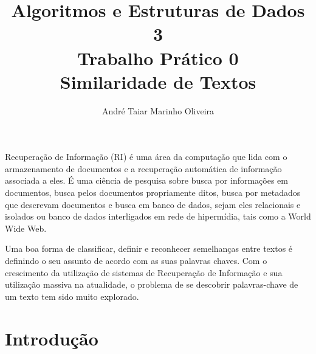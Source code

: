\documentclass[12pt]{article}
\title{Algoritmos e Estruturas de Dados 3 \\ Trabalho Prático 0 \\
\huge{Similaridade de Textos}}
\author{André Taiar Marinho Oliveira}
\begin{document}
\maketitle

\begin{resumo}
Recuperação de Informação (RI) é uma área da computação  que lida com o armazenamento de documentos 
e a recuperação automática de informação associada a eles. É uma ciência de pesquisa sobre busca 
por informações em documentos, busca pelos documentos propriamente ditos, busca por metadados que 
descrevam documentos e busca em banco de dados, sejam eles relacionais e isolados ou banco de 
dados interligados em rede de hipermídia, tais como a World Wide Web.

Uma boa forma de classificar, definir e reconhecer semelhanças entre textos é definindo o
seu assunto de acordo com as suas palavras chaves. Com o crescimento da
utilização de sistemas de Recuperação de Informação e sua utilização massiva na
atualidade, o problema de se descobrir palavras-chave de um texto tem sido muito
explorado.
\end{resumo}

\section{Introdução}
\end{document}
